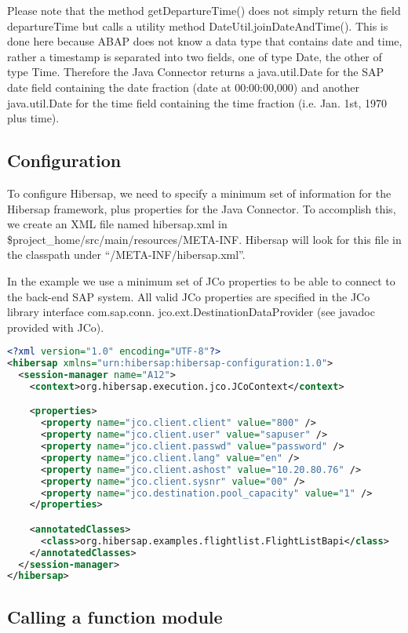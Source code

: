 Please note that the method getDepartureTime() does not simply return the field departureTime
but calls a utility method DateUtil.joinDateAndTime(). This is done here because ABAP does not know a
data type that contains date and time, rather a timestamp is separated into two fields, one
of type Date, the other of type Time. Therefore the Java Connector returns a java.util.Date for the SAP
date field containing the date fraction (date at 00:00:00,000) and another java.util.Date for the time
field containing the time fraction (i.e. Jan. 1st, 1970 plus time).


\subsection{Configuration}

To configure Hibersap, we need to specify a minimum set of information for the Hibersap framework,
plus properties for the Java Connector. To accomplish this, we create an XML file named hibersap.xml in \$project\_home/src/main/resources/META-INF. Hibersap will look for this file in the classpath under ``/META-INF/hibersap.xml''.

In the example we use a minimum set of JCo properties to be able to connect to the back-end SAP system.
All valid JCo properties are specified in the JCo library interface com.sap.conn. jco.ext.DestinationDataProvider (see
javadoc provided with JCo).

\begin{lstlisting}[language=XML,caption=hibersap.xml]
<?xml version="1.0" encoding="UTF-8"?>
<hibersap xmlns="urn:hibersap:hibersap-configuration:1.0">
  <session-manager name="A12">
    <context>org.hibersap.execution.jco.JCoContext</context>

    <properties>
      <property name="jco.client.client" value="800" />
      <property name="jco.client.user" value="sapuser" />
      <property name="jco.client.passwd" value="password" />
      <property name="jco.client.lang" value="en" />
      <property name="jco.client.ashost" value="10.20.80.76" />
      <property name="jco.client.sysnr" value="00" />
      <property name="jco.destination.pool_capacity" value="1" />
    </properties>

    <annotatedClasses>
      <class>org.hibersap.examples.flightlist.FlightListBapi</class>
    </annotatedClasses>
  </session-manager>
</hibersap>
\end{lstlisting}


\subsection{Calling a function module}

